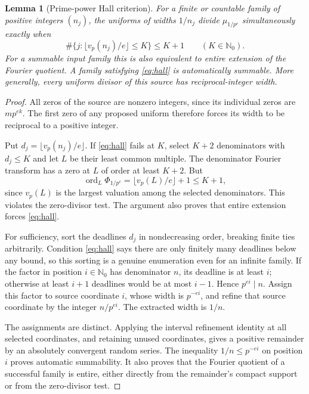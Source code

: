 \documentclass[11pt,letterpaper]{article}
\newtheorem{lemma}[theorem]{Lemma}
\theoremstyle{definition}
\theoremstyle{remark}
\newcommand{\N}{\mathbb N_0}
\DeclareMathOperator{\ord}{ord}
\numberwithin{equation}{section}
\begin{document}
\begin{lemma}[Prime-power Hall criterion]\label{lem:hall}
For a finite or countable family of positive integers $(n_j)$, the uniforms of widths $1/n_j$ divide $\mu_{1/p^e}$ simultaneously exactly when
\begin{equation}\label{eq:hall}
 \#\{j: \lfloor v_p(n_j)/e\rfloor\le K\}\le K+1
 \qquad(K\in\N).
\end{equation}
For a summable input family this is also equivalent to entire extension of the Fourier quotient. A family satisfying \eqref{eq:hall} is automatically summable. More generally, every uniform divisor of this source has reciprocal-integer width.
\end{lemma}
\begin{proof}
All zeros of the source are nonzero integers, since its individual zeros are $mp^{ek}$. The first zero of any proposed uniform therefore forces its width to be reciprocal to a positive integer.

Put $d_j=\lfloor v_p(n_j)/e\rfloor$. If \eqref{eq:hall} fails at $K$, select $K+2$ denominators with $d_j\le K$ and let $L$ be their least common multiple. The denominator Fourier transform has a zero at $L$ of order at least $K+2$. But
\[
 \ord_L\Phi_{1/p^e}=\lfloor v_p(L)/e\rfloor+1\le K+1,
\]
since $v_p(L)$ is the largest valuation among the selected denominators. This violates the zero-divisor test. The argument also proves that entire extension forces \eqref{eq:hall}.

For sufficiency, sort the deadlines $d_j$ in nondecreasing order, breaking finite ties arbitrarily. Condition \eqref{eq:hall} says there are only finitely many deadlines below any bound, so this sorting is a genuine enumeration even for an infinite family. If the factor in position $i\in\N$ has denominator $n$, its deadline is at least $i$; otherwise at least $i+1$ deadlines would be at most $i-1$. Hence $p^{ei}\mid n$. Assign this factor to source coordinate $i$, whose width is $p^{-ei}$, and refine that source coordinate by the integer $n/p^{ei}$. The extracted width is $1/n$.

The assignments are distinct. Applying the interval refinement identity at all selected coordinates, and retaining unused coordinates, gives a positive remainder by an absolutely convergent random series. The inequality $1/n\le p^{-ei}$ on position $i$ proves automatic summability. It also proves that the Fourier quotient of a successful family is entire, either directly from the remainder's compact support or from the zero-divisor test.
\end{proof}
\end{document}
